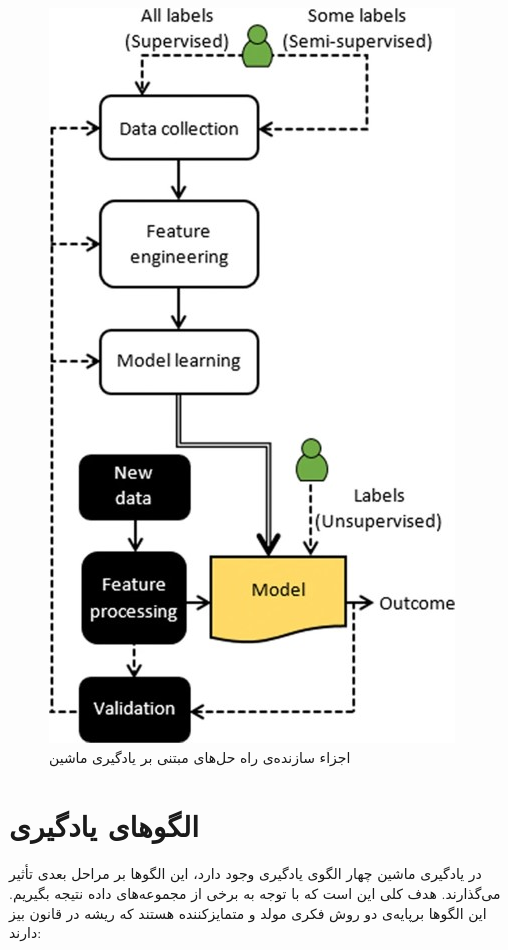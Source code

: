 \begin{figure}[!h]
\centering\includegraphics[scale=.8]{./figures/Solution}
\caption{اجزاء سازنده‌ی راه حل‌های مبتنی بر یادگیری ماشین\cite{boutaba2018comprehensive}}\label{fig.1}
\end{figure}

\newpage

\section{الگوهای یادگیری}

در یادگیری ماشین چهار الگوی یادگیری وجود دارد، این الگوها بر مراحل بعدی تأثیر می‌گذارند. هدف کلی این است که با توجه به برخی از مجموعه‌های داده نتیجه بگیریم. این الگوها برپایه‌ی دو روش فکری مولد    و متمایزکننده  هستند که ریشه در قانون بیز   دارند:

